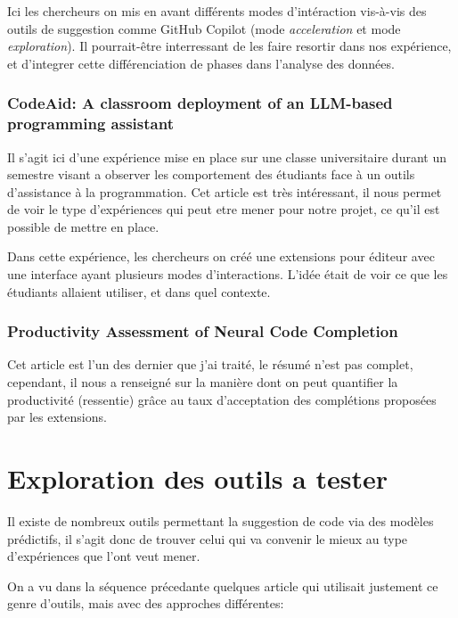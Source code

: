 Ici les chercheurs on mis en avant différents modes d'intéraction vis-à-vis des outils de suggestion comme GitHub Copilot (mode \emph{acceleration} et mode \emph{exploration}).
Il pourrait-être interressant de les faire resortir dans nos expérience, et d'integrer cette différenciation de phases dans l'analyse des données.


\subsubsection{CodeAid: A classroom deployment of an LLM-based programming assistant \cite{codeaid}}

Il s'agit ici d'une expérience mise en place sur une classe universitaire durant un semestre visant a observer les comportement des étudiants
face à un outils d'assistance à la programmation.
Cet article est très intéressant, il nous permet de voir le type d'expériences qui peut etre mener pour notre projet, ce qu'il est possible de mettre en place.

Dans cette expérience, les chercheurs on créé une extensions pour éditeur avec une interface ayant plusieurs modes d'interactions.
L'idée était de voir ce que les étudiants allaient utiliser, et dans quel contexte.


\subsubsection{Productivity Assessment of Neural Code Completion \cite{productivity-assess}}

Cet article est l'un des dernier que j'ai traité, le résumé n'est pas complet, cependant, il nous a renseigné sur la manière dont on peut
quantifier la productivité (ressentie) grâce au taux d'acceptation des complétions proposées par les extensions.


\section{Exploration des outils a tester}
\label{explo}

Il existe de nombreux outils permettant la suggestion de code via des modèles prédictifs, il s'agit donc de trouver celui qui va convenir le mieux au type d'expériences que l'ont veut mener.

On a vu dans la séquence précedante quelques article qui utilisait justement ce genre d'outils, mais avec des approches différentes:

